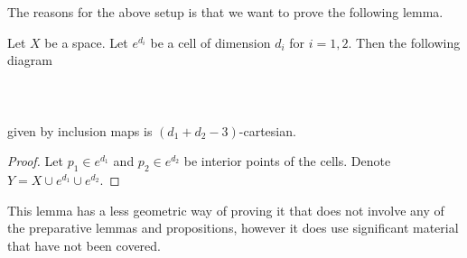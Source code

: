 \documentclass[a4paper]{article}
\begin{document}
The reasons for the above setup is that we want to prove the following lemma. 

\begin{lmm}{}{} Let $X$ be a space. Let $e^{d_i}$ be a cell of dimension $d_i$ for $i=1,2$. Then the following diagram \\~\\
\\~\\
given by inclusion maps is $(d_1+d_2-3)$-cartesian. \tcbline
\begin{proof}
Let $p_1\in e^{d_1}$ and $p_2\in e^{d_2}$ be interior points of the cells. Denote $Y=X\cup e^{d_1}\cup e^{d_2}$. 
\end{proof}
\end{lmm}

This lemma has a less geometric way of proving it that does not involve any of the preparative lemmas and propositions, however it does use significant material that have not been covered. 
\end{document}
